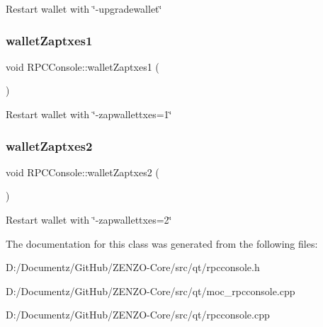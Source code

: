 Restart wallet with \char`\"{}-\/upgradewallet\char`\"{} \mbox{\label{class_r_p_c_console_ab99e8a7e0a6164126aa18c59827722d5}} 
\subsubsection{\texorpdfstring{walletZaptxes1}{walletZaptxes1}}
{\footnotesize\ttfamily void R\+P\+C\+Console\+::wallet\+Zaptxes1 (\begin{DoxyParamCaption}{ }\end{DoxyParamCaption})\hspace{0.3cm}{\ttfamily [slot]}}

Restart wallet with \char`\"{}-\/zapwallettxes=1\char`\"{} \mbox{\label{class_r_p_c_console_ab96912afa85d43a67a4db4869faccdd9}} 
\subsubsection{\texorpdfstring{walletZaptxes2}{walletZaptxes2}}
{\footnotesize\ttfamily void R\+P\+C\+Console\+::wallet\+Zaptxes2 (\begin{DoxyParamCaption}{ }\end{DoxyParamCaption})\hspace{0.3cm}{\ttfamily [slot]}}

Restart wallet with \char`\"{}-\/zapwallettxes=2\char`\"{} 

The documentation for this class was generated from the following files\+:\begin{DoxyCompactItemize}
\item 
D\+:/\+Documentz/\+Git\+Hub/\+Z\+E\+N\+Z\+O-\/\+Core/src/qt/rpcconsole.\+h\item 
D\+:/\+Documentz/\+Git\+Hub/\+Z\+E\+N\+Z\+O-\/\+Core/src/qt/moc\+\_\+rpcconsole.\+cpp\item 
D\+:/\+Documentz/\+Git\+Hub/\+Z\+E\+N\+Z\+O-\/\+Core/src/qt/rpcconsole.\+cpp\end{DoxyCompactItemize}
